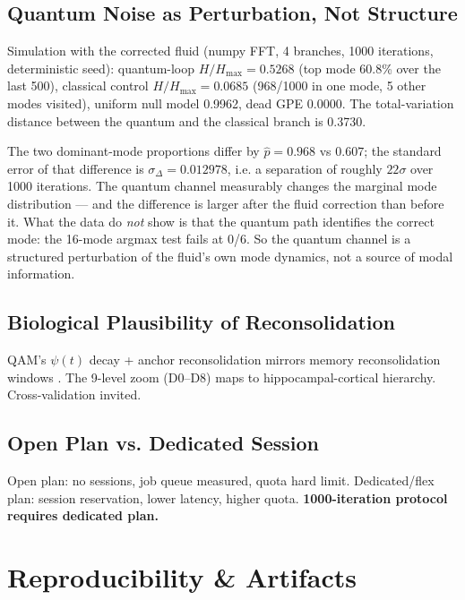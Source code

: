 \documentclass[sigconf,anonymous=false]{acmart}
\begin{document}
\subsection{Quantum Noise as Perturbation, Not Structure}
\label{sec:quantum-noise}
Simulation with the corrected fluid (numpy FFT, 4 branches, 1000 iterations, deterministic seed):
quantum-loop $H/H_{\max} = 0.5268$ (top mode 60.8\% over the last 500), classical control
$H/H_{\max} = 0.0685$ (968/1000 in one mode, 5 other modes visited), uniform null model 0.9962,
dead GPE 0.0000. The total-variation distance between the quantum and the classical branch is
0.3730.

The two dominant-mode proportions differ by $\hat p = 0.968$ vs $0.607$; the standard error of
that difference is $\sigma_{\Delta} = 0.012978$, i.e. a separation of roughly $22\sigma$ over
1000 iterations. The quantum channel measurably changes the marginal mode distribution --- and the
difference is larger after the fluid correction than before it. What the data do \emph{not} show is
that the quantum path identifies the correct mode: the 16-mode argmax test fails at 0/6.
So the quantum channel is a structured perturbation of the fluid's own mode dynamics, not a source
of modal information.

\subsection{Biological Plausibility of Reconsolidation}
QAM's $\psi(t)$ decay + anchor reconsolidation mirrors memory reconsolidation windows \cite{Nader2000}. The 9-level zoom (D0--D8) maps to hippocampal-cortical hierarchy. Cross-validation invited.

\subsection{Open Plan vs. Dedicated Session}
Open plan: no sessions, job queue measured, quota hard limit. Dedicated/flex plan: session reservation, lower latency, higher quota. \textbf{1000-iteration protocol requires dedicated plan.}

\section{Reproducibility \& Artifacts}
\end{document}
